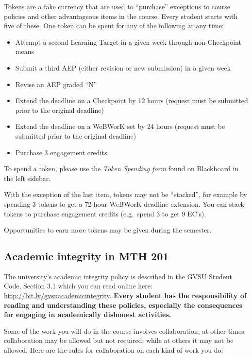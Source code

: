 \documentclass[]{article}
\providecommand{\tightlist}{%
  \setlength{\itemsep}{0pt}\setlength{\parskip}{0pt}}
\begin{document}
Tokens are a fake currency that are used to ``purchase'' exceptions to
course policies and other advantageous items in the course. Every
student starts with five of these. One token can be spent for any of the
following at any time:

\begin{itemize}
\tightlist
\item
  Attempt a second Learning Target in a given week through
  non-Checkpoint means\\
\item
  Submit a third AEP (either revision or new submission) in a given week
\item
  Revise an AEP graded ``N''
\item
  Extend the deadline on a Checkpoint by 12 hours (request must be
  submitted prior to the original deadline)
\item
  Extend the deadline on a WeBWorK set by 24 hours (request must be
  submitted prior to the original deadline)
\item
  Purchase 3 engagement credits
\end{itemize}

To spend a token, please use the \emph{Token Spending form} found on
Blackboard in the left sidebar.

With the exception of the last item, tokens may not be ``stacked'', for
example by spending 3 tokens to get a 72-hour WeBWorK deadline
extension. You can stack tokens to purchase engagement credits
(e.g.~spend 3 to get 9 EC's).

Opportunities to earn more tokens may be given during the semester.

\hypertarget{academic-integrity-in-mth-201}{%
\subsection{Academic integrity in MTH
201}\label{academic-integrity-in-mth-201}}

The university's academic integrity policy is described in the GVSU
Student Code, Section 3.1 which you can read online here:
\url{http://bit.ly/gvsuacademicintegrity}. \textbf{Every student has the
responsibility of reading and understanding these policies, especially
the consequences for engaging in academically dishonest activities.}

Some of the work you will do in the course involves collaboration; at
other times collaboration may be allowed but not required; while at
others it may not be allowed. Here are the rules for collaboration on
each kind of work you do:
\end{document}
